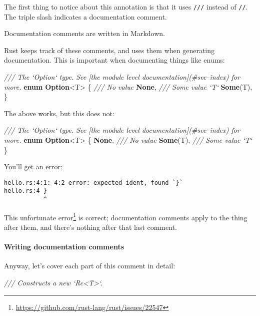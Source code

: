 \documentclass[a4paper,]{book}
\newenvironment{Shaded}{\begin{snugshade}}{\end{snugshade}}
\newcommand{\KeywordTok}[1]{\textcolor[rgb]{0.13,0.29,0.53}{\textbf{{#1}}}}
\newcommand{\CommentTok}[1]{\textcolor[rgb]{0.56,0.35,0.01}{\textit{{#1}}}}
\newcommand{\NormalTok}[1]{{#1}}
\renewcommand{\href}[2]{#2\footnote{\url{#1}}}
\let\oldparagraph\paragraph
\renewcommand{\paragraph}[1]{\oldparagraph{#1}\mbox{}}
\begin{document}
The first thing to notice about this annotation is that it uses
\texttt{///} instead of \texttt{//}. The triple slash indicates a
documentation comment.

Documentation comments are written in Markdown.

Rust keeps track of these comments, and uses them when generating
documentation. This is important when documenting things like enums:

\begin{Shaded}
\begin{Highlighting}[]
\CommentTok{/// The `Option` type. See [the module level documentation](#sec--index) for more.}
\KeywordTok{enum} \KeywordTok{Option}\NormalTok{<T> \{}
    \CommentTok{/// No value}
    \KeywordTok{None}\NormalTok{,}
    \CommentTok{/// Some value `T`}
    \KeywordTok{Some}\NormalTok{(T),}
\NormalTok{\}}
\end{Highlighting}
\end{Shaded}

The above works, but this does not:

\begin{Shaded}
\begin{Highlighting}[]
\CommentTok{/// The `Option` type. See [the module level documentation](#sec--index) for more.}
\KeywordTok{enum} \KeywordTok{Option}\NormalTok{<T> \{}
    \KeywordTok{None}\NormalTok{, }\CommentTok{/// No value}
    \KeywordTok{Some}\NormalTok{(T), }\CommentTok{/// Some value `T`}
\NormalTok{\}}
\end{Highlighting}
\end{Shaded}

You'll get an error:

\begin{verbatim}
hello.rs:4:1: 4:2 error: expected ident, found `}`
hello.rs:4 }
           ^
\end{verbatim}

This \href{https://github.com/rust-lang/rust/issues/22547}{unfortunate
error} is correct; documentation comments apply to the thing after them,
and there's nothing after that last comment.

\paragraph{Writing documentation
comments}\label{writing-documentation-comments}

Anyway, let's cover each part of this comment in detail:

\begin{Shaded}
\begin{Highlighting}[]
\CommentTok{/// Constructs a new `Rc<T>`.}
\end{Highlighting}
\end{Shaded}
\end{document}
